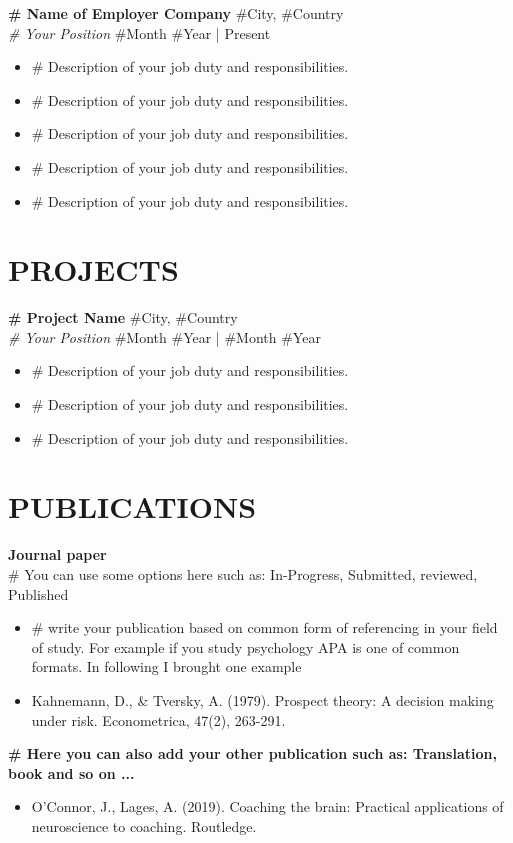 \documentclass[a4paper,9pt]{extarticle}
\begin{document}
\textbf{\# Name of Employer Company} \hfill \#City, \#Country\\ %
\textit{\# Your Position} \hfill \#Month \#Year | Present %
\begin{itemize}
    \item \# Description of your job duty and responsibilities.
    \item \# Description of your job duty and responsibilities.
    \item \# Description of your job duty and responsibilities.
    \item \# Description of your job duty and responsibilities.
    \item \# Description of your job duty and responsibilities.
\end{itemize}

\section*{PROJECTS}
\noindent
\textbf{\# Project Name} \hfill \#City, \#Country\\ %
\textit{\# Your Position}
   \hfill \#Month \#Year | \#Month \#Year %

\begin{itemize}
     \item \# Description of your job duty and responsibilities.
    \item \# Description of your job duty and responsibilities.
    \item \# Description of your job duty and responsibilities.
\end{itemize}

\section*{PUBLICATIONS}
\noindent
\textbf{Journal paper}\\
\textup{\# You can use some options here such as: In-Progress, Submitted, reviewed, Published}%
\begin{itemize}
    \item \# write your publication based on common form of referencing in your field of study. For example if you study psychology APA is one of common formats. In following I brought one example
    \item Kahnemann, D., \& Tversky, A. (1979). Prospect theory: A decision making under risk. Econometrica, 47(2), 263-291.
\end{itemize}
\noindent
\textbf{\# Here you can also add your other publication such as: Translation, book and so on ...}
\begin{itemize}
    \item O'Connor, J., Lages, A. (2019). Coaching the brain: Practical applications of neuroscience to coaching. Routledge.
\end{itemize}
\end{document}
